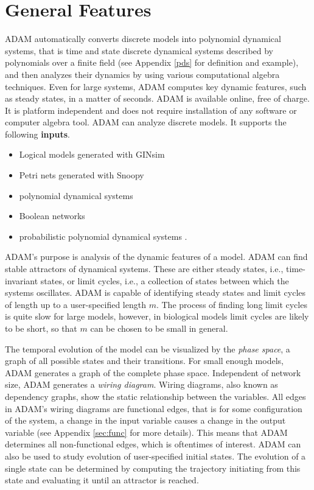 \documentclass[10pt]{bmc_article}
\begin{document}
\section{General Features}
ADAM automatically converts discrete models into polynomial dynamical
systems, that is time and state discrete dynamical systems described by polynomials over a finite field (see Appendix \ref{pds} for definition and example),
%
%
and then analyzes their dynamics by using various computational algebra techniques. Even for large systems, ADAM
computes key dynamic features, such as steady states, in a matter of seconds.
ADAM is available online, free of charge. It is platform
independent and does not require installation of any software or computer
algebra tool.
ADAM can analyze discrete models. It supports the following {\bf inputs}.
\begin{itemize}
\item Logical models generated with GINsim \cite{GINsim}
\item Petri nets generated with Snoopy \cite{Snoopy}
\item polynomial dynamical systems
\item Boolean networks
\item probabilistic polynomial dynamical systems \cite{shmulevich}.
\end{itemize}
ADAM’s purpose is analysis of the dynamic features of a model. ADAM can find stable attractors of dynamical systems. These are either steady states, i.e., time-invariant states,
or limit cycles, i.e., a collection of states between which the systems oscillates. ADAM is capable of identifying steady states and limit cycles of length up to a user-specified length $m$. The process of finding long limit cycles is quite slow for large models, however, in biological models limit cycles are likely to be short, so that $m$ can be chosen to be small in general.

The temporal evolution of the model can be visualized by the {\it phase space}, a graph of all possible states and their transitions. For small enough models, ADAM generates a graph of the complete phase space. Independent of network size, ADAM generates a {\it wiring diagram}. Wiring diagrams, also known as dependency graphs, show the static relationship between the variables. All edges in ADAM’s wiring diagrams are functional edges, that is for some configuration of the system, a change in the input variable causes a change in the output variable (see Appendix \ref{sec:func} for more details). This means that ADAM determines all non-functional edges, which is oftentimes of interest.
ADAM can also be used to study evolution of user-specified initial states. The evolution of a single state can be determined by computing the trajectory initiating from this state and evaluating it until an attractor is reached.
\end{document}
